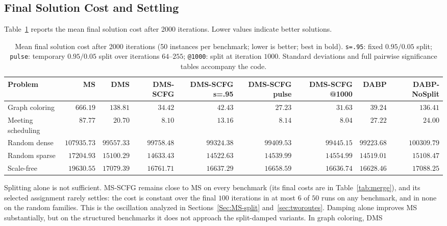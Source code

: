 \subsection{Final Solution Cost and Settling}
Table~\ref{tab:final_costs} reports the mean final solution cost after 2000
iterations.  Lower values indicate better solutions.
\begin{table}[t]
\centering
\caption{Mean final solution cost after 2000 iterations (50 instances per
benchmark; lower is better; best in bold).  \texttt{s=.95}: fixed
$0.95/0.05$ split; \texttt{pulse}: temporary $0.95/0.05$ split over
iterations $64$--$255$; \texttt{@1000}: split at iteration $1000$.
Standard deviations and full pairwise significance tables accompany the
code.}
\label{tab:final_costs}
\scriptsize
\setlength{\tabcolsep}{3.5pt}
\begin{tabular}{lrrrrrrrr}
\toprule
\textbf{Problem}
& \textbf{MS}
& \textbf{DMS}
& \textbf{DMS-SCFG}
& \textbf{DMS-SCFG s=.95}
& \textbf{DMS-SCFG pulse}
& \textbf{DMS-SCFG @1000}
& \textbf{DABP}
& \textbf{DABP-NoSplit} \\
\midrule
Graph coloring
& $666.19$
& $138.81$
& $34.42$
& $42.43$
& $\mathbf{27.23}$
& $31.63$
& $39.24$
& $136.41$ \\
Meeting scheduling
& $87.77$
& $20.70$
& $8.10$
& $13.16$
& $8.14$
& $\mathbf{8.04}$
& $27.22$
& $24.00$ \\
Random dense
& $107935.73$
& $99557.33$
& $99758.48$
& $99324.38$
& $99409.53$
& $99445.15$
& $\mathbf{99223.68}$
& $100309.79$ \\
Random sparse
& $17204.93$
& $15100.29$
& $14633.43$
& $14522.63$
& $14539.99$
& $14554.99$
& $\mathbf{14519.01}$
& $15108.47$ \\
Scale-free
& $19630.55$
& $17079.39$
& $16761.71$
& $16637.29$
& $16658.59$
& $16636.74$
& $\mathbf{16628.46}$
& $17088.25$ \\
\bottomrule
\end{tabular}
\end{table}
Splitting alone is not sufficient.  MS-SCFG remains close to MS on every
benchmark (its final costs are in Table~\ref{tab:merge}), and its selected
assignment rarely settles: the cost is
constant over the final $100$ iterations in at most $6$ of $50$ runs on
any benchmark, and in none on the random families.  This
is the oscillation analyzed in Sections~\ref{Sec:MS-split}
and~\ref{sec:tworoutes}.
Damping alone improves MS substantially, but on the structured benchmarks
it does not approach the split-damped variants.  In graph coloring, DMS
